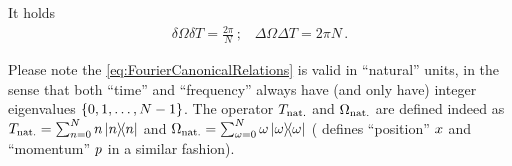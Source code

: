 It holds
\begin{gather}
  \delta\Omega \delta T = \frac{2\pi}{N} \, \text{;} \quad
  \Delta\Omega \Delta T = 2\pi N \, \text{.}
\end{gather}

\noindent{\color{red} \rule{\linewidth}{1pt}}  %

Please note the \eqref{eq:FourierCanonicalRelations} is valid in ``natural'' units,
in the sense that
both ``time'' and ``frequency'' 
always have (and only have) integer eigenvalues $\left\{0, 1, \dots, N-1\right\}$.
The operator ${T}_{\mathrm{nat.}}$ and ${\Omega}_{\mathrm{nat.}}$ are defined indeed as
${T}_{\mathrm{nat.}} = \sum_{n=0}^{N} n \ketbra{n}$ and
${\Omega}_{\mathrm{nat.}} = \sum_{\omega=0}^{N} \omega \ketbra{\omega}$
(\citereset\cite{FiniteHilb} defines ``position'' ${x}$ and ``momentum'' ${p}$ in a similar fashion).


